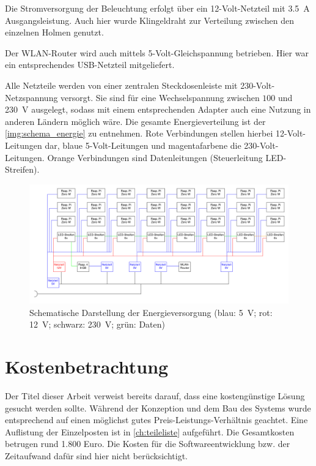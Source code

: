 \documentclass[./00PhotoBox.tex]{subfiles}
\begin{document}
Die Stromversorgung der Beleuchtung erfolgt über ein 12-Volt-Netzteil mit \SI{3,5}{\ampere} Ausgangsleistung. Auch hier wurde Klingeldraht zur Verteilung zwischen den einzelnen Holmen genutzt.

Der WLAN-Router wird auch mittels 5-Volt-Gleichspannung betrieben. Hier war ein entsprechendes USB-Netzteil mitgeliefert.

Alle Netzteile werden von einer zentralen Steckdosenleiste mit 230-Volt-Netzspannung versorgt. Sie sind für eine Wechselspannung zwischen $100$ und \SI{230}{\volt} ausgelegt, sodass mit einem entsprechenden Adapter auch eine Nutzung in anderen Ländern möglich wäre. Die gesamte Energieverteilung ist der \autoref{img:schema_energie} zu entnehmen. Rote Verbindungen stellen hierbei 12-Volt-Leitungen dar, blaue 5-Volt-Leitungen und magentafarbene die 230-Volt-Leitungen. Orange Verbindungen sind Datenleitungen (Steuerleitung LED-Streifen).

\begin{figure}
    \centering
    \includegraphics[width=1.\textwidth]{./img/uml/uml_energie.pdf}
    \caption{Schematische Darstellung der Energieversorgung (blau: \SI{5}{\volt}; rot: \SI{12}{\volt}; schwarz: \SI{230}{\volt}; grün: Daten)}
    \label{img:schema_energie}
\end{figure}


\section{Kostenbetrachtung}
Der Titel dieser Arbeit verweist bereits darauf, dass eine kostengünstige Lösung gesucht werden sollte. Während der Konzeption und dem Bau des Systems wurde entsprechend auf einen möglichst gutes Preis-Leistungs-Verhältnis geachtet. Eine Auflistung der Einzelposten ist in \autoref{ch:teileliste} aufgeführt. Die Gesamtkosten betrugen rund 1.800 Euro. Die Kosten für die Softwareentwicklung bzw. der Zeitaufwand dafür sind hier nicht berücksichtigt.
\end{document}
